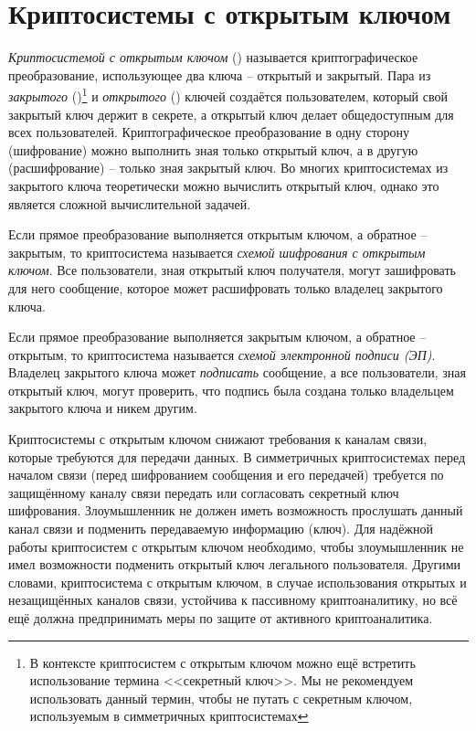 \chapter{Криптосистемы с открытым ключом}\label{chapter-public-key}

\emph{Криптосистемой с открытым ключом} () называется криптографическое преобразование, использующее два ключа -- открытый и закрытый. Пара из \emph{закрытого} ()\footnote{В контексте криптосистем с открытым ключом можно ещё встретить использование термина <<секретный ключ>>. Мы не рекомендуем использовать данный термин, чтобы не путать с секретным ключом, используемым в симметричных криптосистемах} и \emph{открытого} () ключей создаётся пользователем, который свой закрытый ключ держит в секрете, а открытый ключ делает общедоступным для всех пользователей. Криптографическое преобразование в одну сторону (шифрование) можно выполнить зная только открытый ключ, а в другую (расшифрование) -- только зная закрытый ключ. Во многих криптосистемах из закрытого ключа теоретически можно вычислить открытый ключ, однако это является сложной вычислительной задачей.

Если прямое преобразование выполняется открытым ключом, а обратное -- закрытым, то криптосистема называется \emph{схемой шифрования с открытым ключом}. Все пользователи, зная открытый ключ получателя, могут зашифровать для него сообщение, которое может расшифровать только владелец закрытого ключа.

Если прямое преобразование выполняется закрытым ключом, а обратное -- открытым, то криптосистема называется \emph{схемой электронной подписи (ЭП)}. Владелец закрытого ключа может \emph{подписать} сообщение, а все пользователи, зная открытый ключ, могут проверить, что подпись была создана только владельцем закрытого ключа и никем другим.

Криптосистемы с открытым ключом снижают требования к каналам связи, которые требуются для передачи данных. В симметричных криптосистемах перед началом связи (перед шифрованием сообщения и его передачей) требуется по защищённому каналу связи передать или согласовать секретный ключ шифрования. Злоумышленник не должен иметь возможность прослушать данный канал связи и подменить передаваемую информацию (ключ). Для надёжной работы криптосистем с открытым ключом необходимо, чтобы злоумышленник не имел возможности подменить открытый ключ легального пользователя. Другими словами, криптосистема с открытым ключом, в случае использования открытых и незащищённых каналов связи, устойчива к пассивному криптоаналитику, но всё ещё должна предпринимать меры по защите от активного криптоаналитика.


